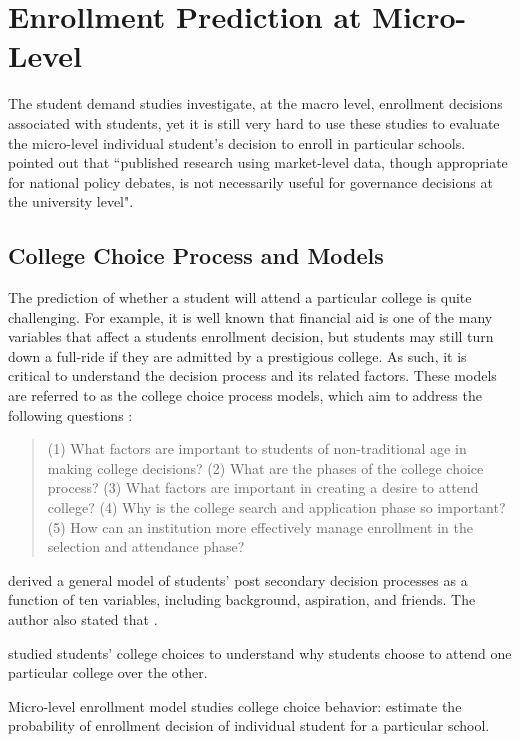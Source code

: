 \documentclass[12pt,english]{report}
\begin{document}
\section{Enrollment Prediction at Micro-Level}
The student demand studies investigate, at the macro level, enrollment decisions associated with students, yet it is still very hard to use these studies to evaluate the micro-level individual student's decision to enroll in particular schools. \citet{Carter2011} pointed out that ``published research using market-level data, though appropriate for national policy debates, is not necessarily useful for governance decisions at the university level".

\subsection{College Choice Process and Models} 
The prediction of whether a student will attend a particular college is quite challenging.  For example,  it is well known that financial aid is one of the many variables that affect a students enrollment decision, but students may still turn down a full-ride
if they are admitted by a prestigious college.  As such, it is critical to understand the decision process and its related factors. These models are referred to as the college choice process models, which aim to address the following questions \citep{Paulsen1990}:
\begin{quote}
(1) What factors are important to students of non-traditional age in making college decisions? (2) What are the phases of the college choice process? (3) What factors are important in creating a desire to attend college? (4) Why is the college search and application phase so important? (5) How can an institution more effectively manage enrollment in the selection and attendance phase?
\end{quote}

\citet{Jackson1978} derived a general model of students' post secondary decision processes as a function of ten variables, 
including background, aspiration, and friends. The author also stated that .

\citet{Paulsen1990} studied students' college choices to understand why 
students choose to attend one particular college over the other.

Micro-level enrollment model studies college choice behavior: estimate the 
probability of enrollment decision of individual student for a particular 
school.
\end{document}
